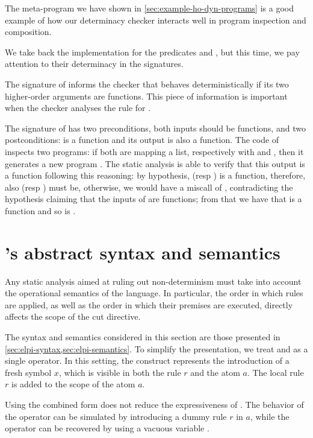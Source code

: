 The meta-program we have shown in \cref{sec:example-ho-dyn-programs} is a good
example of how our determinacy checker interacts well in program inspection and
composition.

We take back the implementation for the predicates  and , but
 this time, we pay attention to their determinacy in the signatures.




The signature of  informs the checker that  behaves
deterministically if its two higher-order arguments are functions. This piece of
information is important when the checker analyses the rule for .

The signature of  has two preconditions, both inputs
should be functions, and two postconditions:  is a function and
its output is also a function.
The code of  inspects two programs: if both are
mapping a list, respectively with  and , then it
generates a new program . The static analysis
is able to verify that this output is a function following this
reasoning: by hypothesis,  (resp ) is a function, therefore,
also  (resp ) must be, otherwise, we would have a miscall of ,
contradicting the hypothesis claiming that
the inputs of  are functions; from that we have that
 is a function and so is .

\section{\elpi's abstract syntax and semantics}
\label{sec:elpi-syn-sem-det}

Any static analysis aimed at ruling out non-determinism must take into account
the operational semantics of the language. In particular, the order in which
rules are applied, as well as the order in which their premises are executed,
directly affects the scope of the cut directive.

The \elpi syntax and semantics considered in this section are those presented
in \cref{sec:elpi-syntax,sec:elpi-semantics}. To simplify the presentation, we
treat  and \eI{=>} as a single operator. In this setting, the construct
 represents the introduction of a fresh symbol $x$, which is
visible in both the rule $r$ and the atom $a$. The local rule $r$ is added to
the scope of the atom $a$.

Using the combined form  does not reduce the expressiveness
of \elpi. The behavior of the  operator can be simulated by introducing
a dummy rule $r$ in $a$, while the \eI{=>} operator can be recovered by using a
vacuous variable .

